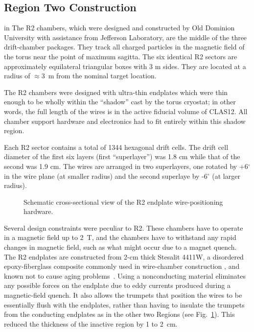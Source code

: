 
\subsection{Region Two Construction}

 in 
The R2 chambers, which were designed and constructed by Old Dominion University 
with assistance from Jefferson Laboratory, are the middle of the three  
drift-chamber packages.  They track all charged particles in the magnetic field 
of the torus near the point of maximum sagitta.  The six identical R2 sectors 
are approximately equilateral triangular boxes with 3 m sides. 
They are located at a radius of $\approx$3~m from the nominal target location.  
  
The R2 chambers were designed with ultra-thin endplates which were thin enough
to be wholly within the ``shadow'' cast by the torus cryostat; in other words,
the full length of the wires is in the active fiducial volume of CLAS12. 
All chamber support hardware and electronics had to fit 
entirely within this shadow region.

Each R2 sector contains a total of 1344 hexagonal drift cells.  The drift cell
diameter of the first six layers (first ``superlayer'') was 1.8 cm while that
of the second was 1.9 cm.   The 
wires are arranged in two superlayers, one rotated by +6$^\circ$ in the wire plane 
(at smaller radius) and the second superlaye by -6$^\circ$ (at larger radius).  

\begin{figure}[htpb]   
\vspace{6.0cm}
\caption{\small{Schematic cross-sectional view of the R2 endplate 
wire-positioning hardware.}} 
\label{r2_inserts}
\end{figure}   



Several design constraints were peculiar to R2.  These chambers have to operate 
in a magnetic field up to 2~T, and the chambers have to withstand any rapid 
changes in magnetic field, such as what might occur due to a magnet quench.
The R2 endplates are constructed from 2-cm thick Stesalit 4411W, a disordered 
epoxy-fiberglass composite commonly used in wire-chamber construction
\cite{stesalit}, and known not to cause aging problems~\cite{stesalitaging}.  
Using a nonconducting material eliminates any possible forces on the endplate 
due to eddy currents produced during a magnetic-field quench.  It also allows 
the trumpets that position the wires to be essentially flush with the endplates, 
rather than having to insulate the trumpets from the conducting endplates as in 
the other two Regions (see Fig.~\ref{r2_inserts}).  This reduced the thickness of 
the inactive region by 1 to 2~cm.




 
